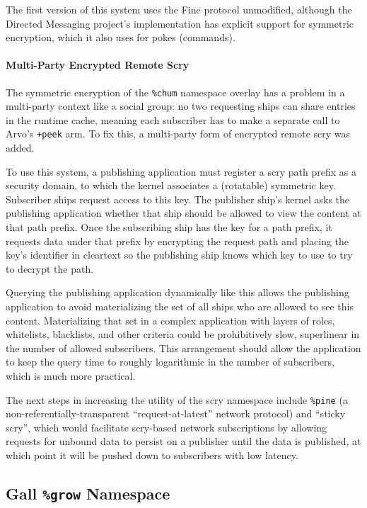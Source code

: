 \documentclass[twoside]{article}
\begin{document}
The first version of this system uses the Fine protocol unmodified, although the Directed Messaging project's implementation has explicit support for symmetric encryption, which it also uses for pokes (commands).

\paragraph{Multi-Party Encrypted Remote Scry}

The symmetric encryption of the \lstinline[style=inlinecode]{%chum} namespace overlay has a problem in a multi-party context like a social group: no two requesting ships can share entries in the runtime cache, meaning each subscriber has to make a separate call to Arvo's \lstinline[style=inlinecode]{+peek} arm.  To fix this, a multi-party form of encrypted remote scry was added.

To use this system, a publishing application must register a scry path prefix as a security domain, to which the kernel associates a (rotatable) symmetric key.  Subscriber ships request access to this key.  The publisher ship's kernel asks the publishing application whether that ship should be allowed to view the content at that path prefix.  Once the subscribing ship has the key for a path prefix, it requests data under that prefix by encrypting the request path and placing the key's identifier in cleartext so the publishing ship knows which key to use to try to decrypt the path.

Querying the publishing application dynamically like this allows the publishing application to avoid materializing the set of all ships who are allowed to see this content.  Materializing that set in a complex application with layers of roles, whitelists, blacklists, and other criteria could be prohibitively slow, superlinear in the number of allowed subscribers.  This arrangement should allow the application to keep the query time to roughly logarithmic in the number of subscribers, which is much more practical.

The next steps in increasing the utility of the scry namespace include \lstinline[style=inlinecode]{%pine} (a non-referentially-transparent ``request-at-latest'' network protocol) and ``sticky scry'', which would facilitate scry-based network subscriptions by allowing requests for unbound data to persist on a publisher until the data is published, at which point it will be pushed down to subscribers with low latency.

\subsection{Gall \texttt{\%grow} Namespace}
\end{document}

